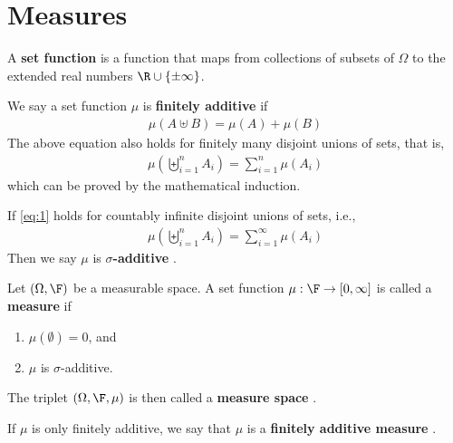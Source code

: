 \documentclass[thmcnt=section, 12pt]{elegantbook}
\begin{document}

\section{Measures}


\par A \textbf{set function}  is a function that maps from collections of subsets of $\Omega$ to the extended real numbers $\R \cup \left\{\pm \infty\right\}$.

\par We say a set function $\mu$ is \textbf{finitely additive}  if 
\begin{align*}
    \mu(A \uplus B) = \mu(A) + \mu(B)
\end{align*}
The above equation also holds for finitely many disjoint unions of sets, that is, 
\begin{align}
    \mu\left(\biguplus_{i=1}^n A_i\right) = \sum_{i=1}^n \mu(A_i)
    \label{eq:1}
\end{align}
which can be proved by the mathematical induction.

\par If \eqref{eq:1} holds for countably infinite disjoint unions of sets, i.e., 
\begin{align*}
    \mu\left(\biguplus_{i=1}^n A_i\right) = \sum_{i=1}^\infty \mu(A_i)
\end{align*}
Then we say $\mu$ is \textbf{$\sigma$-additive} . 


\begin{definition}
    Let $(\Omega, \F)$ be a measurable space. A set function $\mu: \F \to [0, \infty]$ is called a \textbf{measure}  if
    \begin{enumerate}
        \item $\mu(\emptyset) = 0$, and 
        \item $\mu$ is $\sigma$-additive.
    \end{enumerate}
    The triplet $(\Omega, \F, \mu)$ is then called a \textbf{measure space} .
\end{definition}

\par If $\mu$ is only finitely additive, we say that $\mu$ is a \textbf{finitely additive measure} . 
\end{document}
